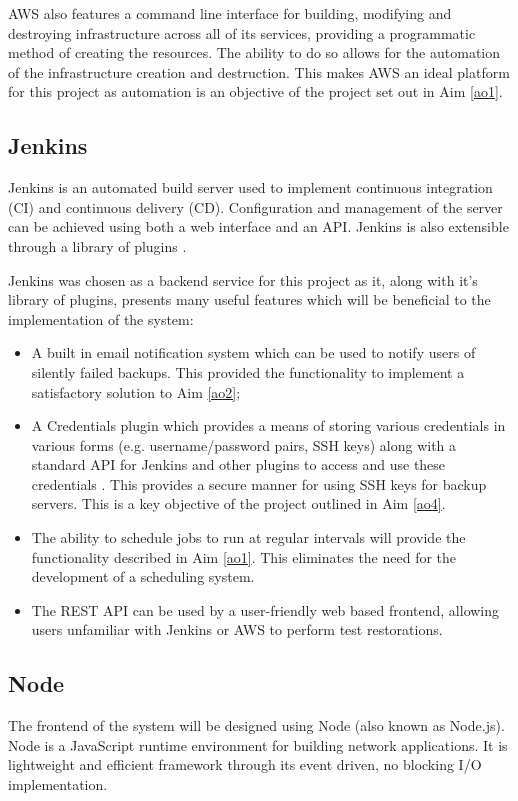 \label{aws-cli} AWS also features a command line interface for building, modifying and destroying infrastructure across all of its services, providing a programmatic method of creating the resources. The ability to do so allows for the automation of the infrastructure creation and destruction. This makes AWS an ideal platform for this project as automation is an objective of the project set out in Aim \ref{ao1}. 


\subsection{Jenkins}
Jenkins is an automated build server used to implement continuous integration (CI) and continuous delivery (CD). Configuration and management of the server can be achieved using both a web interface and an API. Jenkins is also extensible through a library of plugins \citep{jenkins}.
 
Jenkins was chosen as a backend service for this project as it, along with it's library of plugins, presents many useful features which will be beneficial to the implementation of the system:
\begin{itemize}
	\item A built in email notification system which can be used to notify users of silently failed backups. This provided the functionality to implement a satisfactory solution to Aim \ref{ao2};
	\item \label{creds-plugin}A Credentials plugin which provides a means of storing various credentials in various forms (e.g. username/password pairs, SSH keys) along with a standard API for Jenkins and other plugins to access and use these credentials \citep{connolly}. This provides a secure manner for using SSH keys for backup servers. This is a key objective of the project outlined in Aim \ref{ao4}.
	\item The ability to schedule jobs to run at regular intervals will provide the functionality described in Aim \ref{ao1}. This eliminates the need for the development of a scheduling system. 
	\item The REST API can be used by a user-friendly web based frontend, allowing users unfamiliar with Jenkins or AWS to perform test restorations. 
\end{itemize}


\subsection{Node}
The frontend of the system will be designed using Node (also known as Node.js). Node is a JavaScript runtime environment for building network applications. It is lightweight and efficient framework through its event driven, no blocking I/O implementation. 

